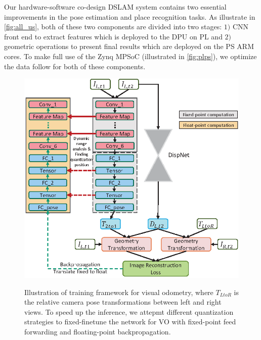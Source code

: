 \label{sec:hardsoft}
Our hardware-software co-design DSLAM system contains two essential improvements in the pose estimation and place recognition tasks. As illustrate in \cref{fig:all_us}, both of these two components are divided into two stages: $1)$ CNN front end to extract features which is deployed to the DPU on PL and $2)$ geometric operations to present final results which are deployed on the PS ARM cores. To make full use of the Zynq MPSoC (illustrated in \cref{fig:plps}), we optimize the data follow for both of these components.

\begin{figure}[t]  
    \centering  
    {\includegraphics[width=\linewidth]{fig/depth_vo_feat.eps}\label{fig:dvo}}
    \caption{Illustration of training framework for visual odometry, where $T_{LtoR}$ is the relative camera pose transformations between left and right views. To speed up the inference, we attepmt different quantization strategies to fixed-finetune the network for VO with fixed-point feed forwarding and floating-point backpropagation.}
\end{figure}

